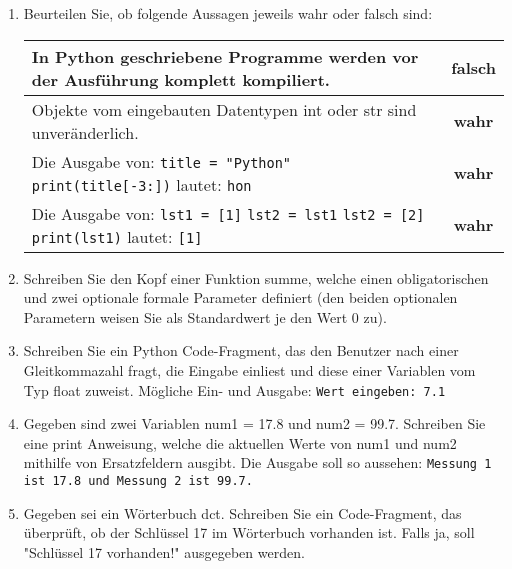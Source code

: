 \documentclass[11pt, oneside]{book}
\begin{document}
\begin{enumerate}[label=(\alph*)]
    \item Beurteilen Sie, ob folgende Aussagen jeweils wahr oder falsch sind:
    
    \begin{tabularx}{\textwidth}{ | X | c | }
    \hline
    In Python geschriebene Programme werden vor der Ausführung komplett kompiliert. & \textbf{falsch} \\
    \hline
    Objekte vom eingebauten Datentypen int oder str sind unveränderlich. & \textbf{wahr} \\
    \hline
    Die Ausgabe von: \newline
    \hspace*{1cm}\texttt{title = "Python"} \newline
    \hspace*{1cm}\texttt{print(title[-3:])} \newline
    lautet: \texttt{hon} & \textbf{wahr} \\
    \hline
    Die Ausgabe von: \newline
    \hspace*{1cm}\texttt{lst1 = [1]} \newline
    \hspace*{1cm}\texttt{lst2 = lst1} \newline
    \hspace*{1cm}\texttt{lst2 = [2]} \newline
    \hspace*{1cm}\texttt{print(lst1)} \newline
    lautet: \texttt{[1]} & \textbf{wahr} \\
    \hline
    \end{tabularx}
    
    \item Schreiben Sie den Kopf einer Funktion summe, welche einen obligatorischen und zwei optionale formale Parameter definiert (den beiden optionalen Parametern weisen Sie als Standardwert je den Wert 0 zu).
    
    \item Schreiben Sie ein Python Code-Fragment, das den Benutzer nach einer Gleitkommazahl fragt, die Eingabe einliest und diese einer Variablen vom Typ float zuweist. Mögliche Ein- und Ausgabe: \newline
    \texttt{Wert eingeben: 7.1}
    
    \item Gegeben sind zwei Variablen num1 = 17.8 und num2 = 99.7. Schreiben Sie eine print Anweisung, welche die aktuellen Werte von num1 und num2 mithilfe von Ersatzfeldern ausgibt. Die Ausgabe soll so aussehen: \newline
    \texttt{Messung 1 ist 17.8 und Messung 2 ist 99.7.}
    
    \item Gegeben sei ein Wörterbuch dct. Schreiben Sie ein Code-Fragment, das \"uberpr\"uft, ob der Schl\"ussel 17 im Wörterbuch vorhanden ist. Falls ja, soll "Schl\"ussel 17 vorhanden!" ausgegeben werden.
\end{enumerate}
\end{document}
